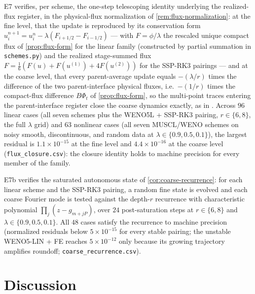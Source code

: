 \documentclass[pdflatex,sn-mathphys-num]{sn-jnl}%
\theoremstyle{thmstyleone}%
\theoremstyle{thmstyletwo}%
\theoremstyle{thmstylethree}%
\begin{document}
E7 verifies, per scheme, the one-step telescoping identity underlying the realized-flux register, in the physical-flux normalization of \cref{rem:flux-normalization}: at the fine level, that the update is reproduced by its conservation form $u^{n+1}_i=u^n_i-\lambda(F_{i+1/2}-F_{i-1/2})$ --- with $F=\phi/\lambda$ the rescaled unique compact flux of \cref{prop:flux-form} for the linear family (constructed by partial summation in \texttt{schemes.py}) and the realized stage-summed flux $F=\tfrac16(F(u)+F(u^{(1)})+4F(u^{(2)}))$ for the SSP-RK3 pairings --- and at the coarse level, that every parent-average update equals $-(\lambda/r)$ times the difference of the two parent-interface physical fluxes, i.e.\ $-(1/r)$ times the compact-flux difference $B\Phi_t$ of \cref{prop:flux-form}, so the multi-point traces entering the parent-interface register close the coarse dynamics exactly, as in \cite{PolemitisChristakisDrikakis2026FVerasure}.
Across $96$ linear cases (all seven schemes plus the WENO5L + SSP-RK3 pairing, $r\in\{6,8\}$, the full $\lambda$ grid) and $63$ nonlinear cases (all seven MUSCL/WENO schemes on noisy smooth, discontinuous, and random data at $\lambda\in\{0.9,0.5,0.1\}$), the largest residual is $1.1\times10^{-15}$ at the fine level and $4.4\times10^{-16}$ at the coarse level (\texttt{flux\_closure.csv}): the closure identity holds to machine precision for every member of the family.

E7b verifies the saturated autonomous state of \cref{cor:coarse-recurrence}: for each linear scheme and the SSP-RK3 pairing, a random fine state is evolved and each coarse Fourier mode is tested against the depth-$r$ recurrence with characteristic polynomial $\prod_j(z-g_{m+jP})$, over $24$ post-saturation steps at $r\in\{6,8\}$ and $\lambda\in\{0.9,0.5,0.1\}$.
All $48$ cases satisfy the recurrence to machine precision (normalized residuals below $5\times10^{-15}$ for every stable pairing; the unstable WENO5-LIN + FE reaches $5\times10^{-12}$ only because its growing trajectory amplifies roundoff; \texttt{coarse\_recurrence.csv}).

\section{Discussion}\label{sec:discussion}
\end{document}
